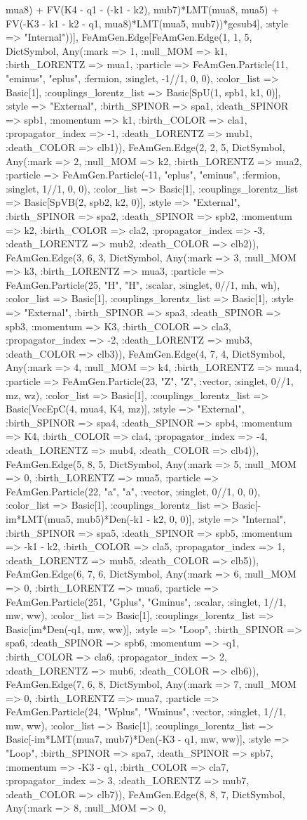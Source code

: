 \documentclass{revtex4}
\begin{document}
\begin{figure}[!htb]
\begin{center}
{mua8) + FV(K4 - q1 - (-k1 - k2), mub7)*LMT(mua8, mua5) + FV(-K3 - k1 - k2 - q1, mua8)*LMT(mua5, mub7))*gcsub4], :style => "Internal"))], FeAmGen.Edge[FeAmGen.Edge(1, 1, 5, Dict{Symbol, Any}(:mark => 1, :null_MOM => k1, :birth_LORENTZ => mua1, :particle => FeAmGen.Particle(11, "eminus", "eplus", :fermion, :singlet, -1//1, 0, 0), :color_list => Basic[1], :couplings_lorentz_list => Basic[SpU(1, spb1, k1, 0)], :style => "External", :birth_SPINOR => spa1, :death_SPINOR => spb1, :momentum => k1, :birth_COLOR => cla1, :propagator_index => -1, :death_LORENTZ => mub1, :death_COLOR => clb1)), FeAmGen.Edge(2, 2, 5, Dict{Symbol, Any}(:mark => 2, :null_MOM => k2, :birth_LORENTZ => mua2, :particle => FeAmGen.Particle(-11, "eplus", "eminus", :fermion, :singlet, 1//1, 0, 0), :color_list => Basic[1], :couplings_lorentz_list => Basic[SpVB(2, spb2, k2, 0)], :style => "External", :birth_SPINOR => spa2, :death_SPINOR => spb2, :momentum => k2, :birth_COLOR => cla2, :propagator_index => -3, :death_LORENTZ => mub2, :death_COLOR => clb2)), FeAmGen.Edge(3, 6, 3, Dict{Symbol, Any}(:mark => 3, :null_MOM => k3, :birth_LORENTZ => mua3, :particle => FeAmGen.Particle(25, "H", "H", :scalar, :singlet, 0//1, mh, wh), :color_list => Basic[1], :couplings_lorentz_list => Basic[1], :style => "External", :birth_SPINOR => spa3, :death_SPINOR => spb3, :momentum => K3, :birth_COLOR => cla3, :propagator_index => -2, :death_LORENTZ => mub3, :death_COLOR => clb3)), FeAmGen.Edge(4, 7, 4, Dict{Symbol, Any}(:mark => 4, :null_MOM => k4, :birth_LORENTZ => mua4, :particle => FeAmGen.Particle(23, "Z", "Z", :vector, :singlet, 0//1, mz, wz), :color_list => Basic[1], :couplings_lorentz_list => Basic[VecEpC(4, mua4, K4, mz)], :style => "External", :birth_SPINOR => spa4, :death_SPINOR => spb4, :momentum => K4, :birth_COLOR => cla4, :propagator_index => -4, :death_LORENTZ => mub4, :death_COLOR => clb4)), FeAmGen.Edge(5, 8, 5, Dict{Symbol, Any}(:mark => 5, :null_MOM => 0, :birth_LORENTZ => mua5, :particle => FeAmGen.Particle(22, "a", "a", :vector, :singlet, 0//1, 0, 0), :color_list => Basic[1], :couplings_lorentz_list => Basic[-im*LMT(mua5, mub5)*Den(-k1 - k2, 0, 0)], :style => "Internal", :birth_SPINOR => spa5, :death_SPINOR => spb5, :momentum => -k1 - k2, :birth_COLOR => cla5, :propagator_index => 1, :death_LORENTZ => mub5, :death_COLOR => clb5)), FeAmGen.Edge(6, 7, 6, Dict{Symbol, Any}(:mark => 6, :null_MOM => 0, :birth_LORENTZ => mua6, :particle => FeAmGen.Particle(251, "Gplus", "Gminus", :scalar, :singlet, 1//1, mw, ww), :color_list => Basic[1], :couplings_lorentz_list => Basic[im*Den(-q1, mw, ww)], :style => "Loop", :birth_SPINOR => spa6, :death_SPINOR => spb6, :momentum => -q1, :birth_COLOR => cla6, :propagator_index => 2, :death_LORENTZ => mub6, :death_COLOR => clb6)), FeAmGen.Edge(7, 6, 8, Dict{Symbol, Any}(:mark => 7, :null_MOM => 0, :birth_LORENTZ => mua7, :particle => FeAmGen.Particle(24, "Wplus", "Wminus", :vector, :singlet, 1//1, mw, ww), :color_list => Basic[1], :couplings_lorentz_list => Basic[-im*LMT(mua7, mub7)*Den(-K3 - q1, mw, ww)], :style => "Loop", :birth_SPINOR => spa7, :death_SPINOR => spb7, :momentum => -K3 - q1, :birth_COLOR => cla7, :propagator_index => 3, :death_LORENTZ => mub7, :death_COLOR => clb7)), FeAmGen.Edge(8, 8, 7, Dict{Symbol, Any}(:mark => 8, :null_MOM => 0, }
\end{center}
\end{figure}
\end{document}
